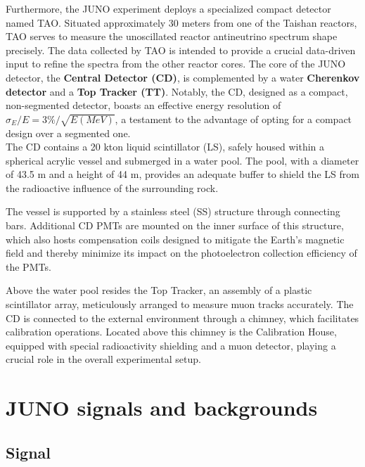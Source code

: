 Furthermore, the JUNO experiment deploys a specialized compact detector named TAO. Situated approximately 30 meters from one of the Taishan reactors, TAO serves to measure the unoscillated reactor antineutrino spectrum shape precisely. The data collected by TAO is intended to provide a crucial data-driven input to refine the spectra from the other reactor cores. The core of the JUNO detector, the \textbf{Central Detector (CD)}, is complemented by a water \textbf{Cherenkov detector} and a \textbf{Top Tracker (TT)}. Notably, the CD, designed as a compact, non-segmented detector, boasts an effective energy resolution of $\sigma_E/E =3\% / \sqrt{E (MeV)}$, a testament to the advantage of opting for a compact design over a segmented one.\\

The CD contains a 20 kton liquid scintillator (LS), safely housed within a spherical acrylic vessel and submerged in a water pool. The pool, with a diameter of 43.5 m and a height of 44 m, provides an adequate buffer to shield the LS from the radioactive influence of the surrounding rock.

The vessel is supported by a stainless steel (SS) structure through connecting bars. Additional CD PMTs are mounted on the inner surface of this structure, which also hosts compensation coils designed to mitigate the Earth's magnetic field and thereby minimize its impact on the photoelectron collection efficiency of the PMTs.

Above the water pool resides the Top Tracker, an assembly of a plastic scintillator array, meticulously arranged to measure muon tracks accurately. The CD is connected to the external environment through a chimney, which facilitates calibration operations. Located above this chimney is the Calibration House, equipped with special radioactivity shielding and a muon detector, playing a crucial role in the overall experimental setup.


\section{JUNO signals and backgrounds}

\subsection{Signal}

